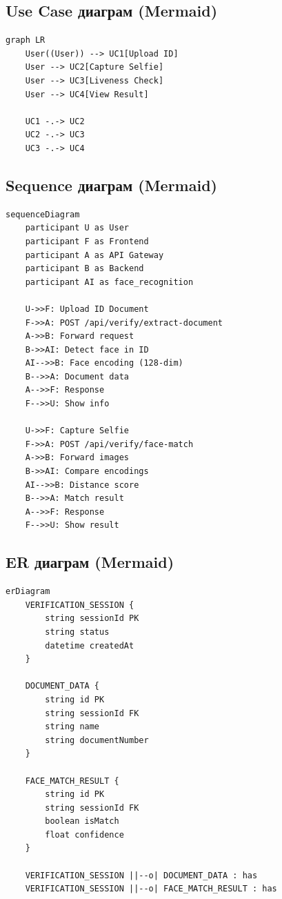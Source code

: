 \documentclass[12pt,a4paper]{article}
\begin{document}
\subsection{Use Case диаграм (Mermaid)}

\begin{lstlisting}[caption={Use Case Diagram (Mermaid)}]
graph LR
    User((User)) --> UC1[Upload ID]
    User --> UC2[Capture Selfie]
    User --> UC3[Liveness Check]
    User --> UC4[View Result]
    
    UC1 -.-> UC2
    UC2 -.-> UC3
    UC3 -.-> UC4
\end{lstlisting}

\subsection{Sequence диаграм (Mermaid)}

\begin{lstlisting}[caption={Verification Sequence (Mermaid)}]
sequenceDiagram
    participant U as User
    participant F as Frontend
    participant A as API Gateway
    participant B as Backend
    participant AI as face_recognition
    
    U->>F: Upload ID Document
    F->>A: POST /api/verify/extract-document
    A->>B: Forward request
    B->>AI: Detect face in ID
    AI-->>B: Face encoding (128-dim)
    B-->>A: Document data
    A-->>F: Response
    F-->>U: Show info
    
    U->>F: Capture Selfie
    F->>A: POST /api/verify/face-match
    A->>B: Forward images
    B->>AI: Compare encodings
    AI-->>B: Distance score
    B-->>A: Match result
    A-->>F: Response
    F-->>U: Show result
\end{lstlisting}

\subsection{ER диаграм (Mermaid)}

\begin{lstlisting}[caption={Data Model (Mermaid)}]
erDiagram
    VERIFICATION_SESSION {
        string sessionId PK
        string status
        datetime createdAt
    }
    
    DOCUMENT_DATA {
        string id PK
        string sessionId FK
        string name
        string documentNumber
    }
    
    FACE_MATCH_RESULT {
        string id PK
        string sessionId FK
        boolean isMatch
        float confidence
    }
    
    VERIFICATION_SESSION ||--o| DOCUMENT_DATA : has
    VERIFICATION_SESSION ||--o| FACE_MATCH_RESULT : has
\end{lstlisting}
\end{document}
